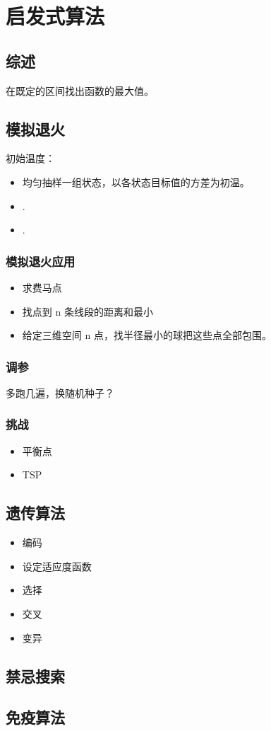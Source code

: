 \documentclass[12pt,a4paper]{article}
\begin{document}
\section{启发式算法}
\subsection{综述}
在既定的区间找出函数的最大值。

\subsection{模拟退火}
初始温度：
\begin{itemize}
  \item 均匀抽样一组状态，以各状态目标值的方差为初温。
  \item .
  \item .
\end{itemize}

\subsubsection{模拟退火应用}
\begin{itemize}
  \item 求费马点
  \item 找点到 n 条线段的距离和最小
  \item 给定三维空间 n 点，找半径最小的球把这些点全部包围。
\end{itemize}
\subsubsection{调参}
多跑几遍，换随机种子？
\subsubsection{挑战}
\begin{itemize}
  \item 平衡点
  \item TSP
\end{itemize}


\subsection{遗传算法}
\begin{itemize}
  \item 编码
  \item 设定适应度函数
  \item 选择
  \item 交叉
  \item 变异
\end{itemize}

\subsection{禁忌搜索}
\subsection{免疫算法}
\end{document}
